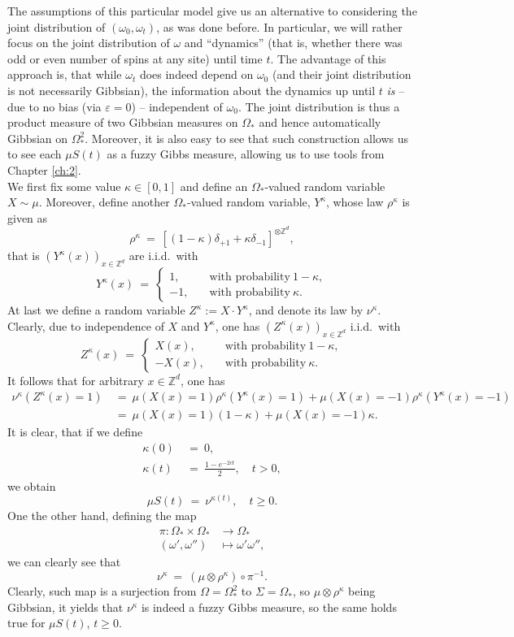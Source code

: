 \documentclass[12pt]{article}
\newcommand{\Z}{\mathbb{Z}}
\newcommand{\oglati}[1]{\left[#1\right]}
\newcommand{\ra}{\rightarrow}
\newcommand{\1}{\mathbbm{1}}
\newcommand{\5}{\vspace{0.5cm}}
\theoremstyle{definition}
\begin{document}
The assumptions of this particular model give us an alternative to considering the joint distribution of $(\omega_0,\omega_t)$, as was done before. In particular, we will rather focus on the joint distribution of $\omega$ and ``dynamics'' (that is, whether there was odd or even number of spins at any site) until time $t$. The advantage of this approach is, that while $\omega_t$ does indeed depend on $\omega_0$ (and their joint distribution is not necessarily Gibbsian), the information about the dynamics up until $t$ \textit{is} -- due to no bias (via $\varepsilon=0$) -- independent of $\omega_0$. The joint distribution is thus a product measure of two Gibbsian measures on $\Omega_*$ and hence automatically Gibbsian on $\Omega_*^2$. Moreover, it is also easy to see that such construction allows us to see each $\mu S(t)$ as a fuzzy Gibbs measure, allowing us to use tools from Chapter \ref{ch:2}. \\

We first fix some value $\kappa\in[0,1]$ and define an $\Omega_*$-valued random variable $X\sim\mu$. Moreover, define another $\Omega_*$-valued random variable, $Y^\kappa$, whose law $\rho^\kappa$ is given as
$$\rho^\kappa ~=~ \oglati{(1-\kappa)\delta_{+1}+\kappa\delta_{-1}}^{\otimes\Z^d},$$
that is $(Y^\kappa(x))_{x\in\Z^d}$ are i.i.d.~with
$$Y^\kappa(x) ~=~ \begin{cases}
1, \quad &\text{with probability}~1-\kappa,\\
-1, \quad &\text{with probability}~\kappa.	
\end{cases}$$
At last we define a random variable $Z^\kappa:=X\cdot Y^\kappa$, and denote its law by $\nu^\kappa$. Clearly, due to independence of $X$ and $Y^\kappa$, one has $(Z^\kappa(x))_{x\in\Z^d}$ i.i.d.~with 
$$Z^\kappa(x) ~=~ \begin{cases}
X(x), \quad &\text{with probability}~1-\kappa,\\
-X(x), \quad &\text{with probability}~\kappa.
\end{cases}$$
It follows that for arbitrary $x\in\Z^d$, one has
\begin{align*}
\nu^\kappa(Z^\kappa(x)=1) ~&=~ \mu(X(x)=1)\rho^\kappa(Y^\kappa(x)=1) + \mu(X(x)=-1)\rho^\kappa(Y^\kappa(x)=-1) \\
&=~ \mu(X(x)=1)(1-\kappa)+\mu(X(x)=-1)\kappa.
\end{align*}
It is clear, that if we  define 
\begin{align*}
\kappa(0) ~&=~ 0, \\
\kappa(t) ~&=~ \frac{1-e^{-2ct}}{2}, \quad t> 0,
\end{align*}
we obtain
$$\mu S(t) ~=~ \nu^{\kappa(t)}, \quad t\geq 0.$$
One the other hand, defining the map
\begin{align*}
\pi:\Omega_*\times\Omega_*&\ra\Omega_* \\
(\omega',\omega'')&\mapsto\omega'\omega'',
\end{align*}
we can clearly see that
$$\nu^{\kappa} ~=~ (\mu\otimes\rho^\kappa)\circ\pi^{-1}.$$
Clearly, such map is a surjection from $\Omega=\Omega_*^2$ to $\Sigma=\Omega_*$, so $\mu\otimes\rho^\kappa$ being Gibbsian, it yields that $\nu^\kappa$ is indeed a fuzzy Gibbs measure, so the same holds true for $\mu S(t)$, $t\geq 0$. \\
\end{document}
